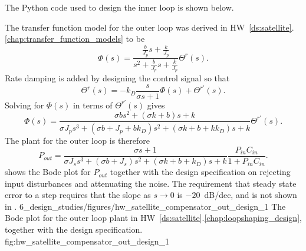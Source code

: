The Python code used to design the inner loop is shown below.

%
%        
%
%
%     
%       
%

The transfer function model for the outer loop was derived in HW~\ref{ds:satellite}.\ref{chap:transfer_function_models} to be
\[
\Phi(s) = \frac{\frac{b}{J_p}s+\frac{k}{J_p}}{s^2+\frac{b}{J_p}s+\frac{k}{J_p}}\Theta^r(s).
\]
Rate damping is added by designing the control signal so that
\[
\Theta^r(s) = -k_D\frac{s}{\sigma s+1}\Phi(s) + \Theta^{r'}(s).
\]
Solving for $\Phi(s)$ in terms of $\Theta^{r'}(s)$ gives
\[
\Phi(s)  = \frac{\sigma b s^2 + (\sigma k + b)s + k}{\sigma J_p s^3 + (\sigma b + J_p + bk_D)s^2+(\sigma k + b + kk_D)s + k}\Theta^{r'}(s).
\]
The plant for the outer loop is therefore
\[
P_{out} =  \frac{\sigma s + 1}{\sigma J_s s^3 + (\sigma b + J_s)s^2+(\sigma k + b + k_D)s + k}\frac{P_{in}C_{in}}{1+P_{in}C_{in}}.
\]
 shows the Bode plot for $P_{out}$ together with the design specification on rejecting input disturbances and attenuating the noise.  The requirement that steady state error to a step requires that the slope as $s\to 0$ is $-20$~dB/dec, and is not shown in .
%
	{6_design_studies/figures/hw_satellite_compensator_out_design_1}
   	{The Bode plot for the outer loop plant in HW~\ref{ds:satellite}.\ref{chap:loopshaping_design}, together with the design specification.}
   	{fig:hw_satellite_compensator_out_design_1}


